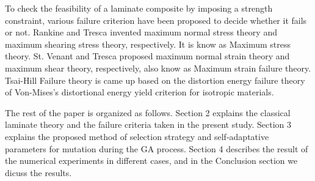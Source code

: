 To check the feasibility of a laminate composite by imposing a strength constraint, various failure
criterion have been proposed to decide whether it fails or not. Rankine and Tresca invented maximum
normal stress theory and maximum shearing stress theory, respectively. It is know as Maximum stress
theory.  St. Venant and Tresca proposed maximum normal strain theory and maximum shear theory,
respectively, also know as Maximum strain failure theory. Tsai-Hill Failure theory is came up based
on the distortion energy failure theory of Von-Mises's distortional energy yield criterion for
isotropic materials. 


The rest of the paper is organized as follows. Section 2 explains the classical laminate theory and
the failure criteria taken in the present study.  Section 3 explains the proposed method of
selection strategy and self-adaptative parameters for mutation during the GA process. Section 4
describes the result of the numerical experiments in different cases, and in the Conclusion section
we dicuss the results.






